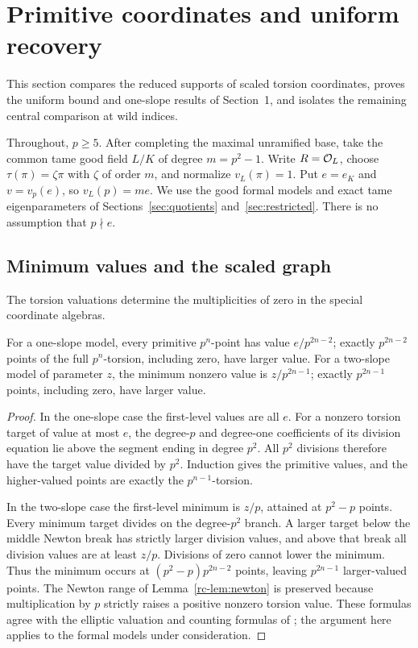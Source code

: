 \section{Primitive coordinates and uniform recovery}\label{sec:one-slope-all-indices}
This section compares the reduced supports of scaled torsion coordinates, proves the uniform bound and one-slope results of Section~1, and isolates the remaining central comparison at wild indices.

Throughout, $p\ge5$. After completing the maximal unramified base, take the common tame good field $L/K$ of degree $m=p^2-1$. Write $R=\mathcal O_L$, choose $\tau(\pi)=\zeta\pi$ with $\zeta$ of order $m$, and normalize $v_L(\pi)=1$. Put $e=e_K$ and $v=v_p(e)$, so $v_L(p)=me$. We use the good formal models and exact tame eigenparameters of Sections~\ref{sec:quotients} and~\ref{sec:restricted}. There is no assumption that $p\nmid e$.

\subsection{Minimum values and the scaled graph}
The torsion valuations determine the multiplicities of zero in the special coordinate algebras.

\begin{lemma}\label{os-lem:minima}
For a one-slope model, every primitive $p^n$-point has value $e/p^{2n-2}$; exactly $p^{2n-2}$ points of the full $p^n$-torsion, including zero, have larger value. For a two-slope model of parameter $z$, the minimum nonzero value is $z/p^{2n-1}$; exactly $p^{2n-1}$ points, including zero, have larger value.
\end{lemma}
\begin{proof}
In the one-slope case the first-level values are all $e$. For a nonzero torsion target of value at most $e$, the degree-$p$ and degree-one coefficients of its division equation lie above the segment ending in degree $p^2$. All $p^2$ divisions therefore have the target value divided by $p^2$. Induction gives the primitive values, and the higher-valued points are exactly the $p^{n-1}$-torsion.

In the two-slope case the first-level minimum is $z/p$, attained at $p^2-p$ points. Every minimum target divides on the degree-$p^2$ branch. A larger target below the middle Newton break has strictly larger division values, and above that break all division values are at least $z/p$. Divisions of zero cannot lower the minimum. Thus the minimum occurs at $(p^2-p)p^{2n-2}$ points, leaving $p^{2n-1}$ larger-valued points. The Newton range of Lemma~\ref{rc-lem:newton} is preserved because multiplication by $p$ strictly raises a positive nonzero torsion value. These formulas agree with the elliptic valuation and counting formulas of \citet[Theorem~4.4 and Corollaries~4.5--4.6, pp.~10--11]{Smith2023}; the argument here applies to the formal models under consideration.
\end{proof}


